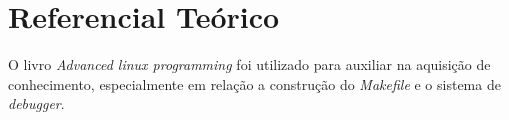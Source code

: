 \chapter[Referencial Teórico]{Referencial Teórico}

  O livro \textit{Advanced linux programming} \cite{advancedlinux} foi utilizado para auxiliar na aquisição de conhecimento, especialmente em relação a construção do \textit{Makefile} e o sistema de \textit{debugger}.